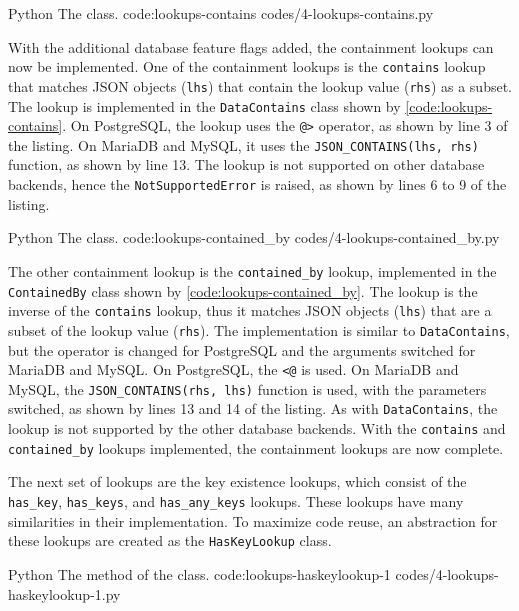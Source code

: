 \listing
{Python}
{The  class.}
{code:lookups-contains}
{codes/4-lookups-contains.py}

With the additional database feature flags added, the containment lookups can
now be implemented. One of the containment lookups is the \verb|contains|
lookup that matches JSON objects (\verb|lhs|) that contain the lookup value
(\verb|rhs|) as a subset. The lookup is implemented in the \verb|DataContains|
class shown by \autoref{code:lookups-contains}. On PostgreSQL, the lookup uses
the \verb|@>| operator, as shown by line 3 of the listing. On MariaDB and
MySQL, it uses the \verb|JSON_CONTAINS(lhs, rhs)| function, as shown by line
13. The lookup is not supported on other database backends, hence the
\verb|NotSupportedError| is raised, as shown by lines 6 to 9 of the listing.

\listing
{Python}
{The  class.}
{code:lookups-contained_by}
{codes/4-lookups-contained_by.py}

The other containment lookup is the \verb|contained_by| lookup, implemented in
the \verb|ContainedBy| class shown by \autoref{code:lookups-contained_by}. The
lookup is the inverse of the \verb|contains| lookup, thus it matches JSON
objects (\verb|lhs|) that are a subset of the lookup value (\verb|rhs|). The
implementation is similar to \verb|DataContains|, but the operator is changed
for PostgreSQL and the arguments switched for MariaDB and MySQL. On PostgreSQL,
the \verb|<@| is used. On MariaDB and MySQL, the \verb|JSON_CONTAINS(rhs, lhs)|
function is used, with the parameters switched, as shown by lines 13 and 14 of
the listing. As with \verb|DataContains|, the lookup is not supported by the
other database backends. With the \verb|contains| and \verb|contained_by|
lookups implemented, the containment lookups are now complete.

The next set of lookups are the key existence lookups, which consist of the
\verb|has_key|, \verb|has_keys|, and \verb|has_any_keys| lookups. These
lookups have many similarities in their implementation. To maximize code reuse,
an abstraction for these lookups are created as the \verb|HasKeyLookup| class.

\listing
{Python}
{The  method of the  class.}
{code:lookups-haskeylookup-1}
{codes/4-lookups-haskeylookup-1.py}

